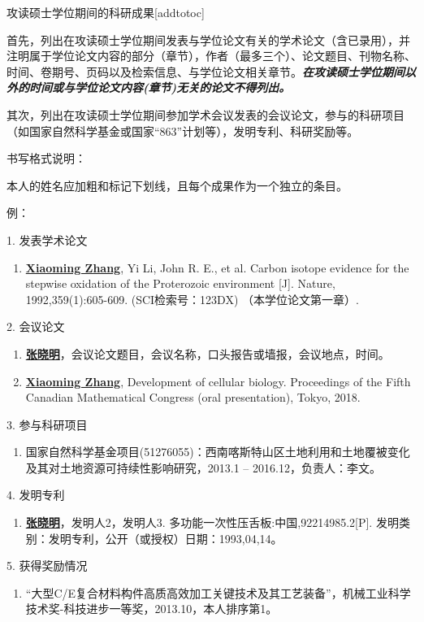 
\begin{personalcv}{攻读硕士学位期间的科研成果}[addtotoc]

首先，列出在攻读硕士学位期间发表与学位论文有关的学术论文（含已录用），并注明属于学位论文内容的部分（章节），作者（最多三个）、论文题目、刊物名称、时间、卷期号、页码以及检索信息、与学位论文相关章节。{\bf\itshape 在攻读硕士学位期间以外的时间或与学位论文内容(章节)无关的论文不得列出。}

其次，列出在攻读硕士学位期间参加学术会议发表的会议论文，参与的科研项目（如国家自然科学基金或国家“863”计划等），发明专利、科研奖励等。

书写格式说明：

本人的姓名应加粗和标记下划线，且每个成果作为一个独立的条目。

例：

1. 发表学术论文
\begin{enumerate}[nosep, label=$\lbrack$\arabic*$\rbrack$]
  \item{\underline{\bf Xiaoming Zhang}, Yi Li, John R. E., et al. Carbon isotope evidence for the stepwise oxidation of the Proterozoic environment [J]. Nature, 1992,359(1):605-609. (SCI检索号：123DX) （本学位论文第一章）.}
\end{enumerate}{}\vspace{1em}

2. 会议论文
\begin{enumerate}[nosep, label=$\lbrack$\arabic*$\rbrack$]
  \item{\underline{\bf 张晓明}，会议论文题目，会议名称，口头报告或墙报，会议地点，时间。}
  \item{\underline{\bf Xiaoming Zhang}, Development of cellular biology. Proceedings of the Fifth Canadian Mathematical Congress (oral presentation), Tokyo, 2018.}
\end{enumerate}{}\vspace{1em}

3. 参与科研项目
\begin{enumerate}[nosep, label=$\lbrack$\arabic*$\rbrack$]
  \item{国家自然科学基金项目(51276055)：西南喀斯特山区土地利用和土地覆被变化及其对土地资源可持续性影响研究，2013.1 – 2016.12，负责人：李文。} %
\end{enumerate}{}\vspace{1em}

4. 发明专利
\begin{enumerate}[nosep, label=$\lbrack$\arabic*$\rbrack$]
  \item{\underline{\bf 张晓明}，发明人2，发明人3. 多功能一次性压舌板:中国,92214985.2[P]. 发明类别：发明专利，公开（或授权）日期：1993,04,14。}
\end{enumerate}{}\vspace{1em}

5. 获得奖励情况
\begin{enumerate}[nosep, label=$\lbrack$\arabic*$\rbrack$]
  \item{“大型C/E复合材料构件高质高效加工关键技术及其工艺装备”，机械工业科学技术奖-科技进步一等奖，2013.10，本人排序第1。}
\end{enumerate}

\end{personalcv}


